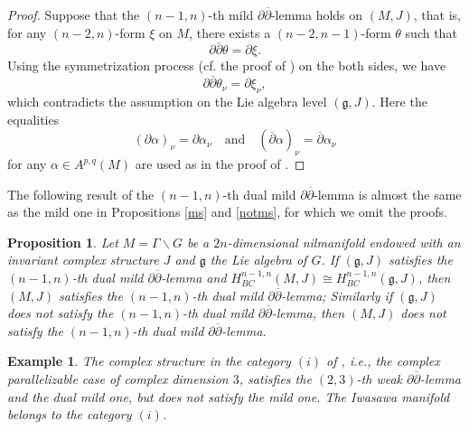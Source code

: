 \documentclass[12pt]{amsart}
\numberwithin{equation}{section}
\newtheorem{proposition}[theorem]{Proposition}
\newtheorem{example}  [theorem]     {Example}
\renewcommand{\1}{\mathds{1}}
\newcommand{\db}{\overline{\partial}}
\renewcommand{\>}{\rightarrow}
\newcommand{\p}{\partial}
\def\p{\partial}
\begin{document}
\begin{proof}
Suppose that the $(n-1,n)$-th mild $\p\db$-lemma holds on $(M,J)$,
that is, for any $(n-2,n)$-form $\xi$ on $M$, there exists a
$(n-2,n-1)$-form $\theta$ such that
\[ \p \db \theta = \p \xi. \]
Using the symmetrization process (cf. the proof of \cite[Proposition
3.2]{UV}) on the both sides, we have
\[ \p \db \theta_{\nu} = \p \xi_{\nu}, \]
which contradicts the assumption on the Lie algebra level
$(\mathfrak{g},J)$. Here the equalities
\[ (\p \alpha)_{\nu} = \p \alpha_{\nu}\quad \text{and} \quad (\db \alpha)_{\nu} = \db \alpha_{\nu}\]
for any $\alpha \in A^{p,q}(M)$ are used as in the proof of
\cite[Proposition 3.2]{UV}.
\end{proof}

The following result of the $(n-1,n)$-th dual mild $\p\db$-lemma is
almost the same as the mild one in Propositions \ref{ms} and
\ref{notms}, for which we omit the proofs.

\begin{proposition}\label{dms}
Let $M = \Gamma \backslash G$ be a $2n$-dimensional nilmanifold
endowed with an invariant complex structure $J$ and $\mathfrak{g}$
the Lie algebra of $G$. If $(\mathfrak{g},J)$ satisfies the
$(n-1,n)$-th dual mild $\p\db$-lemma and $H^{n-1,n}_{BC}(M,J) \cong
H^{n-1,n}_{BC}(\mathfrak{g},J)$, then $(M,J)$ satisfies the
$(n-1,n)$-th dual mild $\p\db$-lemma; Similarly if
$(\mathfrak{g},J)$ does not satisfy the $(n-1,n)$-th dual mild
$\p\db$-lemma, then $(M,J)$ does not satisfy the $(n-1,n)$-th dual
mild $\p\db$-lemma.
\end{proposition}

\begin{example}\label{ex-dms-notms}
\emph{The complex structure in the category $(i)$ of
\cite[Proposition 2.3]{UV}, i.e., the complex parallelizable case of
complex dimension $3$, satisfies the $(2,3)$-th weak $\p\db$-lemma
and the dual mild one, but does not satisfy the mild one. The
Iwasawa manifold belongs to the category $(i)$.}
\end{example}
\end{document}
